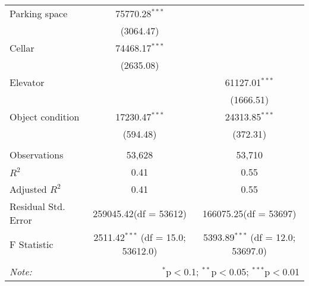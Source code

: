 \begin{table}[!htbp]
\begin{tabular}{@{\extracolsep{5pt}}lcc}
 Parking space & 75770.28$^{***}$ & \\
  & (3064.47) & \\
 Cellar & 74468.17$^{***}$ & \\
  & (2635.08) & \\
 Elevator & & 61127.01$^{***}$ \\
  & & (1666.51) \\
 Object condition & 17230.47$^{***}$ & 24313.85$^{***}$ \\
  & (594.48) & (372.31) \\
\hline \\[-1.8ex]
 Observations & 53,628 & 53,710 \\
 $R^2$ & 0.41 & 0.55 \\
 Adjusted $R^2$ & 0.41 & 0.55 \\
 Residual Std. Error & 259045.42(df = 53612) & 166075.25(df = 53697)  \\
 F Statistic & 2511.42$^{***}$ (df = 15.0; 53612.0) & 5393.89$^{***}$ (df = 12.0; 53697.0) \\
\hline
\hline \\[-1.8ex]
\textit{Note:} & \multicolumn{2}{r}{$^{*}$p$<$0.1; $^{**}$p$<$0.05; $^{***}$p$<$0.01} \\
\end{tabular}
\end{table}